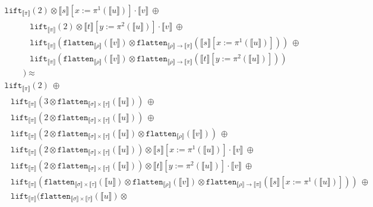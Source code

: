 \documentclass[a4paper,UKenglish,cleveref,autoref,numberwithinsect]{lipics-v2019}
\theoremstyle{definition}
\newcommand{\arrtype}{\rightarrow}
\newcommand{\flatten}{\mathtt{flatten}}
\newcommand{\lift}{\mathtt{lift}}
\newcommand{\typeinterpret}[1]{\llbracket #1 \rrbracket}
\newcommand{\interpret}[1]{\llbracket #1 \rrbracket}
\begin{document}
\begin{itemize}
\[\begin{array}{l}
  \lift_{\typeinterpret{\pi}}(2) \otimes \interpret{s}[x:=\pi^1(
    \interpret{u})] \cdot \interpret{v}\ \oplus \\
  \phantom{ABCD}
  \lift_{\typeinterpret{\pi}}(2) \otimes \interpret{t}[y:=\pi^2(
    \interpret{u})] \cdot \interpret{v}\ \oplus \\
  \phantom{ABCD}
  \lift_{\typeinterpret{\pi}}(
    \flatten_{\typeinterpret{\rho}}(\interpret{v}) \otimes
    \flatten_{\typeinterpret{\rho} \arrtype \typeinterpret{\pi}}(
    \interpret{s}[x:=\pi^1(\interpret{u})]))\ \oplus \\
  \phantom{ABCD}
  \lift_{\typeinterpret{\pi}}(
    \flatten_{\typeinterpret{\rho}}(\interpret{v}) \otimes
    \flatten_{\typeinterpret{\rho} \arrtype
    \typeinterpret{\pi}}(\interpret{t}[y:=\pi^2(\interpret{u})])) \\
  \phantom{ABC}) \approx \\
  \lift_{\typeinterpret{\pi}}(2)\ \oplus \\
  \phantom{A}
  \lift_{\typeinterpret{\pi}}(3 \otimes \flatten_{\typeinterpret{\sigma}
    \times \typeinterpret{\tau}}(\interpret{u}))\ \oplus \\
  \phantom{A}\lift_{\typeinterpret{\pi}}(2 \otimes
    \flatten_{\typeinterpret{\sigma} \times
    \typeinterpret{\tau}}(\interpret{u}))\ \oplus \\
  \phantom{A}
  \lift_{\typeinterpret{\pi}}(2 \otimes
    \flatten_{\typeinterpret{\sigma} \times
    \typeinterpret{\tau}}(\interpret{u}) \otimes
    \flatten_{\typeinterpret{\rho}}(\interpret{v}))\ \oplus \\
  \phantom{A}
  \lift_{\typeinterpret{\pi}}(2 \otimes
    \flatten_{\typeinterpret{\sigma} \times
    \typeinterpret{\tau}}(\interpret{u})) \otimes
    \interpret{s}[x:=\pi^1(\interpret{u})] \cdot \interpret{v}\ \oplus\\
  \phantom{A}
  \lift_{\typeinterpret{\pi}}(2 \otimes
    \flatten_{\typeinterpret{\sigma} \times
    \typeinterpret{\tau}}(\interpret{u})) \otimes
    \interpret{t}[y:=\pi^2(\interpret{u})] \cdot \interpret{v}\ \oplus \\
  \phantom{A}
  \lift_{\typeinterpret{\pi}}(\flatten_{\typeinterpret{\sigma} \times
    \typeinterpret{\tau}}(\interpret{u}) \otimes
    \flatten_{\typeinterpret{\rho}}(\interpret{v}) \otimes
    \flatten_{\typeinterpret{\rho} \arrtype \typeinterpret{\pi}}(
    \interpret{s}[x:=\pi^1(\interpret{u})]))\ \oplus \\
  \phantom{A}
  \lift_{\typeinterpret{\pi}}(\flatten_{\typeinterpret{\sigma} \times
    \typeinterpret{\tau}}(\interpret{u}) \otimes

\end{array}\]
\end{itemize}
\end{document}
